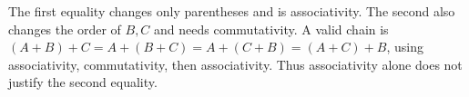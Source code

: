 The first equality changes only parentheses and is associativity. The second also changes the order of $B,C$ and needs commutativity. A valid chain is $(A+B)+C=A+(B+C)=A+(C+B)=(A+C)+B$, using associativity, commutativity, then associativity. Thus associativity alone does not justify the second equality.
